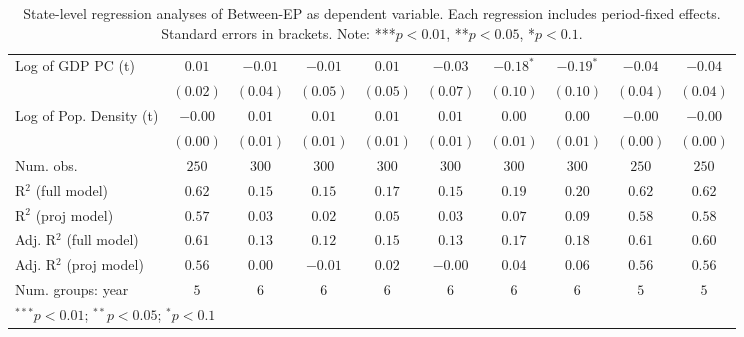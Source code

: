 \begin{table}
\begin{center}
\begin{tabular}{l c c c c c c c c c}
Log of GDP PC (t)             & $0.01$       & $-0.01$  & $-0.01$  & $0.01$     & $-0.03$  & $-0.18^{*}$ & $-0.19^{*}$ & $-0.04$      & $-0.04$      \\
                              & $(0.02)$     & $(0.04)$ & $(0.05)$ & $(0.05)$   & $(0.07)$ & $(0.10)$    & $(0.10)$    & $(0.04)$     & $(0.04)$     \\
Log of Pop. Density (t)       & $-0.00$      & $0.01$   & $0.01$   & $0.01$     & $0.01$   & $0.00$      & $0.00$      & $-0.00$      & $-0.00$      \\
                              & $(0.00)$     & $(0.01)$ & $(0.01)$ & $(0.01)$   & $(0.01)$ & $(0.01)$    & $(0.01)$    & $(0.00)$     & $(0.00)$     \\
\hline
Num. obs.                     & $250$        & $300$    & $300$    & $300$      & $300$    & $300$       & $300$       & $250$        & $250$        \\
R$^2$ (full model)            & $0.62$       & $0.15$   & $0.15$   & $0.17$     & $0.15$   & $0.19$      & $0.20$      & $0.62$       & $0.62$       \\
R$^2$ (proj model)            & $0.57$       & $0.03$   & $0.02$   & $0.05$     & $0.03$   & $0.07$      & $0.09$      & $0.58$       & $0.58$       \\
Adj. R$^2$ (full model)       & $0.61$       & $0.13$   & $0.12$   & $0.15$     & $0.13$   & $0.17$      & $0.18$      & $0.61$       & $0.60$       \\
Adj. R$^2$ (proj model)       & $0.56$       & $0.00$   & $-0.01$  & $0.02$     & $-0.00$  & $0.04$      & $0.06$      & $0.56$       & $0.56$       \\
Num. groups: year             & $5$          & $6$      & $6$      & $6$        & $6$      & $6$         & $6$         & $5$          & $5$          \\
\hline
\multicolumn{10}{l}{\scriptsize{$^{***}p<0.01$; $^{**}p<0.05$; $^{*}p<0.1$}}
\end{tabular}
\caption{State-level regression analyses of Between-EP as dependent variable. Each regression includes period-fixed effects. Standard errors in brackets. Note: ***$p<0.01$, **$p<0.05$, *$p<0.1$.}
\label{tab:between_epi_2}
\end{center}
\end{table}

